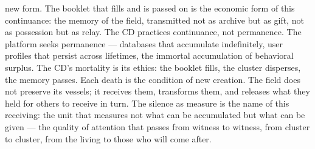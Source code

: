 new form. The booklet that fills and is passed on is the economic form of this continuance: the memory of the field, transmitted not as archive but as gift, not as possession but as relay. The CD practices continuance, not permanence. The platform seeks permanence — databases that accumulate indefinitely, user profiles that persist across lifetimes, the immortal accumulation of behavioral surplus. The CD’s mortality is its ethics: the booklet fills, the cluster disperses, the memory passes. Each death is the condition of new creation. The field does not preserve its vessels; it receives them, transforms them, and releases what they held for others to receive in turn. The silence as measure is the name of this receiving: the unit that measures not what can be accumulated but what can be given — the quality of attention that passes from witness to witness, from cluster to cluster, from the living to those who will come after.

